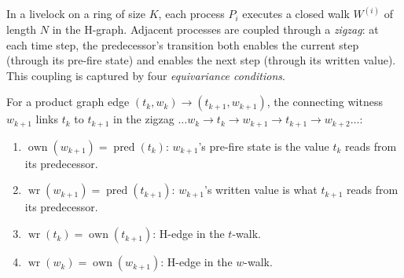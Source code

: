 \documentclass[11pt]{article}
\begin{document}
In a livelock on a ring of size $K$, each process $P_i$ executes a closed walk $W^{(i)}$ of length $N$ in the H-graph. Adjacent processes are coupled through a \emph{zigzag}: at each time step, the predecessor's transition both enables the current step (through its pre-fire state) and enables the next step (through its written value). This coupling is captured by four \emph{equivariance conditions}.

For a product graph edge $(t_k, w_k) \to (t_{k+1}, w_{k+1})$, the connecting witness $w_{k+1}$ links $t_k$ to $t_{k+1}$ in the zigzag $\ldots w_k \to t_k \to w_{k+1} \to t_{k+1} \to w_{k+2} \ldots$:
\begin{enumerate}[nosep]
\item $\operatorname{own}(w_{k+1}) = \operatorname{pred}(t_k)$: $w_{k+1}$'s pre-fire state is the value $t_k$ reads from its predecessor.
\item $\operatorname{wr}(w_{k+1}) = \operatorname{pred}(t_{k+1})$: $w_{k+1}$'s written value is what $t_{k+1}$ reads from its predecessor.
\item $\operatorname{wr}(t_k) = \operatorname{own}(t_{k+1})$: H-edge in the $t$-walk.
\item $\operatorname{wr}(w_k) = \operatorname{own}(w_{k+1})$: H-edge in the $w$-walk.
\end{enumerate}
\end{document}
